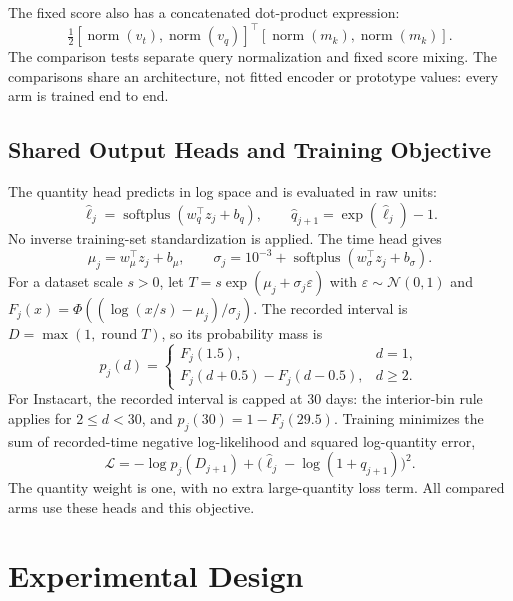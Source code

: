 \documentclass[runningheads]{llncs}
\newcommand{\softplus}{\operatorname{softplus}}
\newcommand{\Nrm}{\operatorname{norm}}
\begin{document}
The fixed score also has a concatenated dot-product expression:
\begin{equation}
 \tfrac12[\Nrm(v_t),\Nrm(v_q)]^\top[\Nrm(m_k),\Nrm(m_k)].
\end{equation}
The comparison tests separate query normalization and fixed score mixing. The comparisons share an architecture, not fitted encoder or prototype values: every arm is trained end to end.

\subsection{Shared Output Heads and Training Objective}
The quantity head predicts in log space and is evaluated in raw units:
\begin{equation}
 \widehat\ell_j=\softplus(w_q^\top z_j+b_q),\qquad
 \widehat q_{j+1}=\exp(\widehat\ell_j)-1.
\end{equation}
No inverse training-set standardization is applied. The time head gives
\begin{equation}
 \mu_j=w_\mu^\top z_j+b_\mu,\qquad
 \sigma_j=10^{-3}+\softplus(w_\sigma^\top z_j+b_\sigma).
\end{equation}
For a dataset scale $s>0$, let $T=s\exp(\mu_j+\sigma_j\varepsilon)$ with $\varepsilon\sim\mathcal N(0,1)$ and $F_j(x)=\Phi((\log(x/s)-\mu_j)/\sigma_j)$. The recorded interval is $D=\max(1,\operatorname{round}T)$, so its probability mass is
\begin{equation}
 p_j(d)=
 \begin{cases}
 F_j(1.5),& d=1,\\
 F_j(d+0.5)-F_j(d-0.5),& d\geq2.
 \end{cases}
 \label{eq:time}
\end{equation}
For Instacart, the recorded interval is capped at 30 days: the interior-bin rule applies for $2\leq d<30$, and $p_j(30)=1-F_j(29.5)$. Training minimizes the sum of recorded-time negative log-likelihood and squared log-quantity error,
\begin{equation}
 \mathcal L=-\log p_j(D_{j+1})+
   \bigl(\widehat\ell_j-\log(1+q_{j+1})\bigr)^2.
\end{equation}
The quantity weight is one, with no extra large-quantity loss term. All compared arms use these heads and this objective.

\section{Experimental Design}
\end{document}
